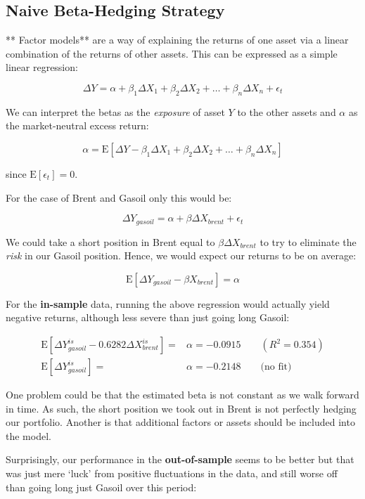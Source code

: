 \documentclass{article}
\begin{document}
    \subsection{Naive Beta-Hedging
Strategy}\label{naive-beta-hedging-strategy}

    ** Factor models** are a way of explaining the returns of one asset via
a linear combination of the returns of other assets. This can be
expressed as a simple linear regression:

\[\Delta Y = \alpha + \beta_1 \Delta X_1 + \beta_2 \Delta X_2 + \dots + \beta_n \Delta X_n + \epsilon_t \]

We can interpret the betas as the \emph{exposure} of asset \(Y\) to the
other assets and \(\alpha\) as the market-neutral excess return:

\[ \alpha = \mathrm{E}[\Delta Y - \beta_1 \Delta X_1 + \beta_2 \Delta X_2 + \dots + \beta_n \Delta X_n] \]

since \(\mathrm{E}[\epsilon_t] =0\).

For the case of Brent and Gasoil only this would be:

\[\Delta Y_{gasoil} = \alpha + \beta \Delta X_{brent} + \epsilon_t \]

We could take a short position in Brent equal to
\(\beta \Delta X_{brent}\) to try to eliminate the \emph{risk} in our
Gasoil position. Hence, we would expect our returns to be on average:

\[\mathrm{E} [\Delta Y_{gasoil} - \beta X_{brent}] = \alpha \]

For the \textbf{in-sample} data, running the above regression would
actually yield negative returns, although less severe than just going
long Gasoil:

\[
\begin{array}{rl}
\mathrm{E} [ \Delta Y_{gasoil}^{is}  -0.6282 \Delta X_{brent}^{is}] =  & \alpha   =  -0.0915 \qquad (R^2 = 0.354) \\
\mathrm{E} [ \Delta Y_{gasoil}^{is}]  =  & \alpha   =   
-0.2148  \qquad  \text{(no fit)}
\end{array}
\]

One problem could be that the estimated beta is not constant as we walk
forward in time. As such, the short position we took out in Brent is not
perfectly hedging our portfolio. Another is that additional factors or
assets should be included into the model.

Surprisingly, our performance in the \textbf{out-of-sample} seems to be
better but that was just mere `luck' from positive fluctuations in the
data, and still worse off than going long just Gasoil over this period:
\end{document}
